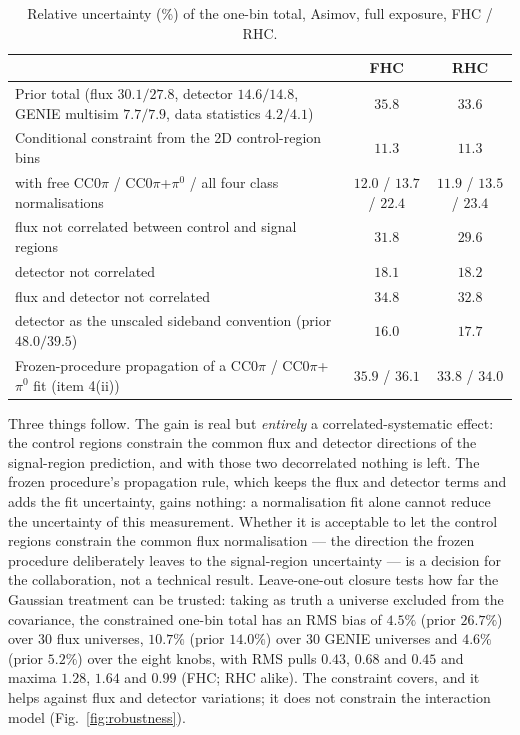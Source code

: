 \documentclass[11pt,a4paper]{article}
\begin{document}
\begin{table}[H]
  \centering
  \caption{Relative uncertainty (\%) of the one-bin total, Asimov, full exposure, FHC / RHC.}
  \label{tab:gain}
  \small
  \begin{tabular}{p{}cc}
    \toprule
    & FHC & RHC \\
    \midrule
    Prior total (flux $30.1/27.8$, detector $14.6/14.8$, GENIE multisim $7.7/7.9$, data statistics $4.2/4.1$) & $35.8$ & $33.6$ \\
    Conditional constraint from the 2D control-region bins & $11.3$ & $11.3$ \\
    \quad with free CC$0\pi$ / CC$0\pi$+$\pi^0$ / all four class normalisations & $12.0$ / $13.7$ / $22.4$ & $11.9$ / $13.5$ / $23.4$ \\
    \quad flux not correlated between control and signal regions & $31.8$ & $29.6$ \\
    \quad detector not correlated & $18.1$ & $18.2$ \\
    \quad flux and detector not correlated & $34.8$ & $32.8$ \\
    \quad detector as the unscaled sideband convention (prior $48.0/39.5$) & $16.0$ & $17.7$ \\
    Frozen-procedure propagation of a CC$0\pi$ / CC$0\pi$+$\pi^0$ fit (item 4(ii)) & $35.9$ / $36.1$ & $33.8$ / $34.0$ \\
    \bottomrule
  \end{tabular}
\end{table}

Three things follow. The gain is real but \emph{entirely} a correlated-systematic effect: the control regions
constrain the common flux and detector directions of the signal-region prediction, and with those two
decorrelated nothing is left. The frozen procedure's propagation rule, which keeps the flux and detector terms
and adds the fit uncertainty, gains nothing: a normalisation fit alone cannot reduce the uncertainty of this
measurement. Whether it is acceptable to let the control regions constrain the common flux normalisation --- the
direction the frozen procedure deliberately leaves to the signal-region uncertainty --- is a decision for the
collaboration, not a technical result. Leave-one-out closure tests how far the Gaussian treatment can be trusted:
taking as truth a universe excluded from the covariance, the constrained one-bin total has an RMS bias of $4.5\%$
(prior $26.7\%$) over 30 flux universes, $10.7\%$ (prior $14.0\%$) over 30 GENIE universes and $4.6\%$ (prior
$5.2\%$) over the eight knobs, with RMS pulls $0.43$, $0.68$ and $0.45$ and maxima $1.28$, $1.64$ and $0.99$
(FHC; RHC alike). The constraint covers, and it helps against flux and detector variations; it does not
constrain the interaction model (Fig.~\ref{fig:robustness}).
\end{document}

